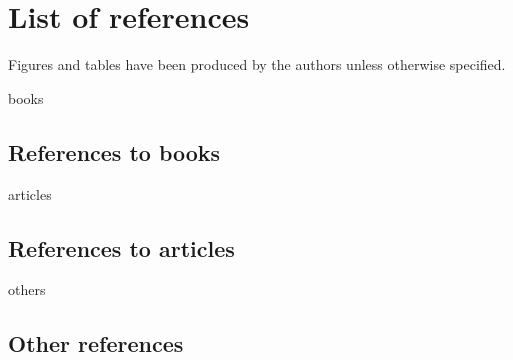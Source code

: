 \chapter*{List of references}  %
	Figures and tables have been produced by the authors unless otherwise specified.
    \begingroup  
    \let\chapter\section 
    \makeatletter\let\markboth\@firstoftwo\makeatother 
    \pagestyle{plain}

    \listoffigures 

    \listoftables

	
    \begin{flushleft}

    \begin{btSect}{books}
        \section*{References to books}
        \btPrintCited
    \end{btSect}

    \begin{btSect}{articles}
        \section*{References to articles}
        \btPrintCited
    \end{btSect}

	\begin{btSect}{others}
		\section*{Other references}
		\btPrintCited
	\end{btSect}

	\end{flushleft}
    \pagestyle{fancy}
\endgroup


